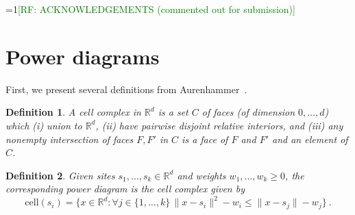 \documentclass[12pt]{article}
\newcommand{\Comments}{1}
\newcommand{\mynote}[2]{\ifnum\Comments=1\textcolor{#1}{#2}\fi}
\newcommand{\raf}[1]{\mynote{green}{[RF: #1]}}
\newcommand{\reals}{\mathbb{R}}
\newcommand{\cell}{\mathrm{cell}}
\newtheorem{conjecture}{Conjecture}
\newtheorem{definition}{Definition}
\begin{document}



\raf{ACKNOWLEDGEMENTS (commented out for submission)}
\newpage



\appendix

\newpage
\section{Power diagrams}
First, we present several definitions from Aurenhammer~\cite{aurenhammer1987power}.
\begin{definition}\label{def:cell-complex}
  A \emph{cell complex} in $\reals^d$ is a set $C$ of faces (of dimension $0,\ldots,d$) which (i) union to $\reals^d$, (ii) have pairwise disjoint relative interiors, and (iii) any nonempty intersection of faces $F,F'$ in $C$ is a face of $F$ and $F'$ and an element of $C$.
\end{definition}

\begin{definition}\label{def:power-diagram}
  Given sites $s_1,\ldots,s_k\in\reals^d$ and weights $w_1,\ldots,w_k \geq 0$, the corresponding \emph{power diagram} is the cell complex given by
  \begin{equation}
    \label{eq:pd}
    \cell(s_i) = \{ x \in\reals^d : \forall j \in \{1,\ldots,k\} \, \|x - s_i\|^2 - w_i \leq \|x - s_j\| - w_j\}~.
  \end{equation}
\end{definition}
\end{document}
